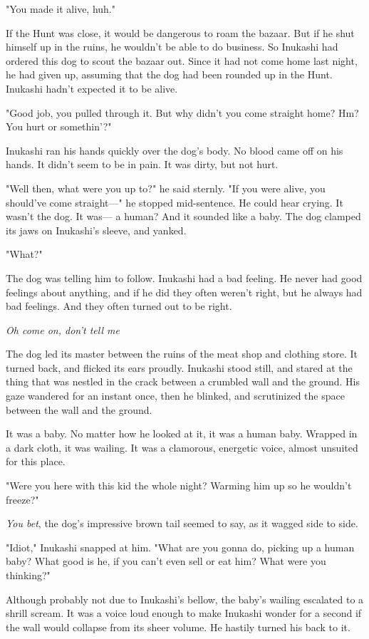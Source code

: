 "You made it alive, huh."

If the Hunt was close, it would be dangerous to roam the bazaar. But if
he shut himself up in the ruins, he wouldn't be able to do business. So
Inukashi had ordered this dog to scout the bazaar out. Since it had not
come home last night, he had given up, assuming that the dog had been
rounded up in the Hunt. Inukashi hadn't expected it to be alive.

"Good job, you pulled through it. But why didn't you come straight home?
Hm? You hurt or somethin'?"

Inukashi ran his hands quickly over the dog's body. No blood came off on
his hands. It didn't seem to be in pain. It was dirty, but not hurt.

"Well then, what were you up to?" he said sternly. "If you were alive,
you should've come straight---" he stopped mid-sentence. He could hear
crying. It wasn't the dog. It was--- a human? And it sounded like a baby.
The dog clamped its jaws on Inukashi's sleeve, and yanked.

"What?"

The dog was telling him to follow. Inukashi had a bad feeling. He never
had good feelings about anything, and if he did they often weren't
right, but he always had bad feelings. And they often turned out to be
right.

\emph{Oh come on, don't tell me\el }

The dog led its master between the ruins of the meat shop and clothing
store. It turned back, and flicked its ears proudly. Inukashi stood
still, and stared at the thing that was nestled in the crack between a
crumbled wall and the ground. His gaze wandered for an instant once,
then he blinked, and scrutinized the space between the wall and the
ground.

It was a baby. No matter how he looked at it, it was a human baby.
Wrapped in a dark cloth, it was wailing. It was a clamorous, energetic
voice, almost unsuited for this place.

"Were you here with this kid the whole night? Warming him up so he
wouldn't freeze?"

\emph{You bet}, the dog's impressive brown tail seemed to say, as it wagged
side to side.

"Idiot," Inukashi snapped at him. "What are you gonna do, picking up a
human baby? What good is he, if you can't even sell or eat him? What
were you thinking?"

Although probably not due to Inukashi's bellow, the baby's wailing
escalated to a shrill scream. It was a voice loud enough to make
Inukashi wonder for a second if the wall would collapse from its sheer
volume. He hastily turned his back to it.

